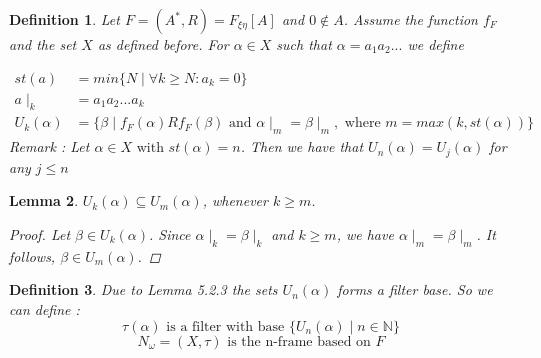 \documentclass[12pt, a4paper]{scrartcl}
\newtheorem{definition}{Definition}[subsection]
\newtheorem{lemma}[definition]{Lemma}
\begin{document}
\begin{definition}
    Let $F = (A^*, R) = F_{\xi \eta}[A]$ and $0 \notin A$. Assume the function $f_F$ and the set $X$ as defined before.
    For $\alpha \in X$ such that $\alpha = a_1a_2...$ we define 
    
    \begin{align*}
            st(a) &= min\{N \mid \forall k \geq N : a_k = 0\} \\
            a \mid_{k} &= a_1a_2...a_k \\
            U_k(\alpha) &= \{ \beta \mid f_F(\alpha)Rf_F(\beta) \mbox{ and } \alpha \mid_m = \beta \mid_m,  \mbox{ where } m = max(k, st(\alpha))\} 
    \end{align*} 
    Remark : Let $\alpha \in X \mbox{ with } st(\alpha) = n$. Then we have that $U_n(\alpha) = U_j(\alpha)$ for any $j \leq n$

\end{definition}

\begin{lemma}
    $U_k(\alpha) \subseteq U_m(\alpha)$, whenever $k \geq m$.
    
    \begin{proof}
        Let $\beta \in U_k(\alpha)$. Since $\alpha \mid_k = \beta \mid_k$ and $k \geq m$, we have $\alpha \mid_m = \beta \mid_m$. It follows, $\beta \in U_m(\alpha)$.
    \end{proof}
\end{lemma}

\begin{definition}
    Due to Lemma 5.2.3 the sets $U_n(\alpha)$ forms a filter base. So we can define :
    $$\tau(\alpha) \mbox{ is a filter with base } \{U_n(\alpha) \mid n \in \mathbb{N} \}$$
    $$N_\omega = (X, \tau) \mbox{ is the n-frame based on } F$$

\end{definition}
\end{document}
